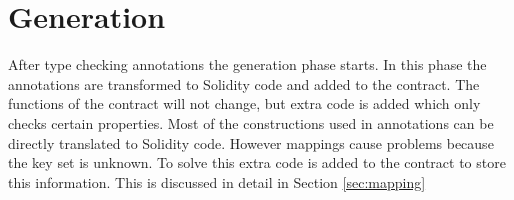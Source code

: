 \documentclass[a4paper]{article}
\begin{document}
\section{Generation}
\label{sec:generation}
After type checking annotations the generation phase starts. In this phase the annotations are transformed to Solidity code and added to the contract. The functions of the contract will not change, but extra code is added which only checks certain properties. Most of the constructions used in annotations can be directly translated to Solidity code. However mappings cause problems because the key set is unknown. To solve this extra code is added to the contract to store this information. This is discussed in detail in Section \ref{sec:mapping}
\end{document}
